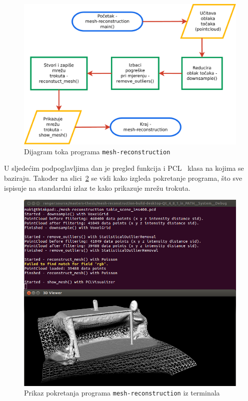 
\setcounter{figure}{1}
\begin{figure}[h]
\renewcommand{\figurename}{Grafikon}
\centering
\includegraphics[scale=0.5]{figures/flowchart.pdf}
\caption{Dijagram toka programa \texttt{mesh-reconstruction} }
\label{fig:flowchart}
\end{figure}

U sljedećim podpoglavljima dan je pregled funkcija i PCL~\cite{pcl}
klasa na kojima se baziraju. Također na
slici~\ref{fig:running-mesh-reconstruction} se vidi kako izgleda
pokretanje programa, što sve ispisuje na standardni izlaz te kako
prikazuje mrežu trokuta.

\newpage
\setcounter{figure}{1}
\begin{figure}[h]
\centering
\includegraphics[scale=0.5]{figures/running-mesh-reconstruction.png}
\caption{Prikaz pokretanja programa \texttt{mesh-reconstruction} iz
terminala}
\label{fig:running-mesh-reconstruction}
\end{figure}

